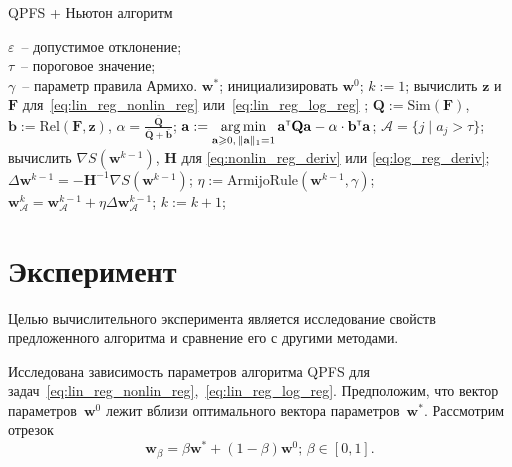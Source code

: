 \documentclass[a4paper,12pt]{article}
\renewcommand{\geq}{\ensuremath{\geqslant}}
\theoremstyle{plain} %
\theoremstyle{definition} %
\theoremstyle{remark} %
\newcommand{\ba}{\mathbf{a}}
\newcommand{\bb}{\mathbf{b}}
\newcommand{\bw}{\mathbf{w}}
\newcommand{\bz}{\mathbf{z}}
\newcommand{\cA}{\mathcal{A}}
\newcommand{\bQ}{\mathbf{Q}}
\newcommand{\bH}{\mathbf{H}}
\newcommand{\bF}{\mathbf{F}}
\newcommand{\T}{{\text{\tiny\sffamily\upshape\mdseries T}}}
\newcommand{\argmin}{\mathop{\arg \min}\limits}
\begin{document}
	\begin{algorithm}
		\caption{QPFS + Ньютон алгоритм}
		\label{pc:QPFSNewton}
		\begin{algorithmic}
			\REQUIRE $\varepsilon$~-- допустимое отклонение;\\
			\hspace{1.07cm}$\tau$~-- пороговое значение;\\
			\hspace{1.07cm}$\gamma$~-- параметр правила Армихо.
			\ENSURE $\bw^*$;
			\STATE  инициализировать $\bw^0$;
			\STATE $k := 1$;
			\REPEAT
			\STATE вычислить $\bz$ и $\bF$ для~\eqref{eq:lin_reg_nonlin_reg} или~\eqref{eq:lin_reg_log_reg} ;
			\vspace{0.1cm}
			\STATE $\bQ := \text{Sim} (\bF)$, $\bb := \text{Rel}(\bF, \bz)$, $\alpha = \frac{\overline{\bQ}}{\overline{\bQ} + \overline{\bb}}$;
			\vspace{0.1cm}
			\STATE $\ba := \argmin_{\ba \geq 0, \, \|\ba\|_1=1}\ba^{\T} \bQ \ba - \alpha \cdot \mathbf{b}^{\T} \ba$;
			\vspace{0.1cm}
			\STATE $\cA = \{j \mid a_j > \tau\}$;
			\vspace{0.1cm}
			\STATE вычислить $\nabla S(\bw^{k-1})$, $\bH$ для \eqref{eq:nonlin_reg_deriv} или \eqref{eq:log_reg_deriv};
			\vspace{0.1cm}
			\STATE $\Delta \bw^{k-1} = - \bH^{-1} \nabla S(\bw^{k-1})$;
			\vspace{0.1cm}
			\STATE $\eta := \text{ArmijoRule}(\bw^{k-1}, \gamma)$;
			\vspace{0.1cm}
			\STATE $\bw_{\cA}^k = \bw_{\cA}^{k - 1} + \eta \Delta \bw_{\cA}^{k - 1}$;
			\vspace{0.1cm}
			\STATE $k := k + 1$;
			\vspace{0.1cm}
			\UNTIL{$\frac{\| \bw^k - \bw^{k-1} \|}{\| \bw^k \|} < \varepsilon$}
		\end{algorithmic}
	\end{algorithm}
	

  	\section*{Эксперимент}
  	Целью вычислительного эксперимента является исследование свойств предложенного алгоритма и сравнение его с другими методами. 
  	
  	Исследована зависимость параметров алгоритма QPFS для задач~\eqref{eq:lin_reg_nonlin_reg},~\eqref{eq:lin_reg_log_reg}. 
  	Предположим, что вектор параметров~$\bw^0$ лежит вблизи оптимального вектора параметров~$\bw^*$. 
  	Рассмотрим отрезок
	\[
	\bw_{\beta} = \beta \bw^* + (1 - \beta) \bw^0; \, \beta \in [0, 1] .
	\]
	
\end{document}

